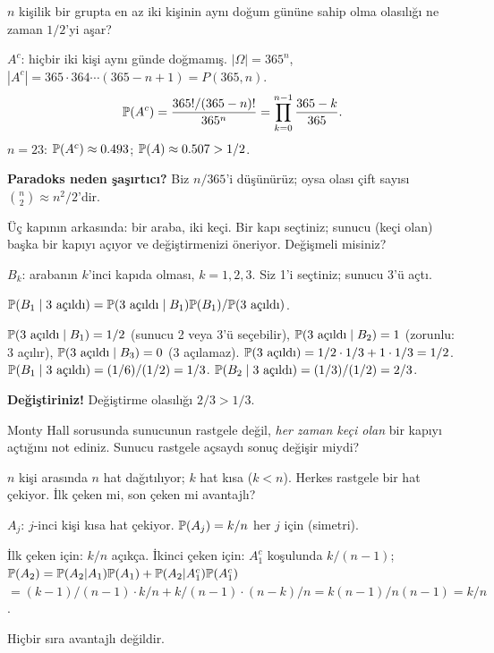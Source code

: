 \begin{ornek}\label{ex:dogumgunu}
$n$ kişilik bir grupta en az iki kişinin aynı doğum gününe sahip olma
olasılığı ne zaman $1/2$'yi aşar?

$A^c$: hiçbir iki kişi aynı günde doğmamış. $|\Omega| = 365^n$,
$|A^c| = 365 \cdot 364 \cdots (365-n+1) = P(365,n)$.
\[
  \mathbb{P}(A^c) = \frac{365!/(365-n)!}{365^n} = \prod_{k=0}^{n-1}\frac{365-k}{365}.
\]
$n=23$: $\mathbb{P}(A^c) \approx 0.493$; $\mathbb{P}(A) \approx 0.507 > 1/2$.

\textbf{Paradoks neden şaşırtıcı?} Biz $n/365$'i düşünürüz; oysa olası çift
sayısı $\binom{n}{2} \approx n^2/2$'dir.
\end{ornek}

\begin{ornek}\label{ex:montyhall}
Üç kapının arkasında: bir araba, iki keçi. Bir kapı seçtiniz; sunucu (keçi
olan) başka bir kapıyı açıyor ve değiştirmenizi öneriyor. Değişmeli misiniz?

$B_k$: arabanın $k$'inci kapıda olması, $k=1,2,3$.
Siz 1'i seçtiniz; sunucu 3'ü açtı.

$\mathbb{P}(B_1 \mid \text{3 açıldı}) = \mathbb{P}(\text{3 açıldı} \mid B_1)\mathbb{P}(B_1) / \mathbb{P}(\text{3 açıldı})$.

$\mathbb{P}(\text{3 açıldı} \mid B_1) = 1/2$ (sunucu 2 veya 3'ü seçebilir),
$\mathbb{P}(\text{3 açıldı} \mid B_2) = 1$ (zorunlu: 3 açılır),
$\mathbb{P}(\text{3 açıldı} \mid B_3) = 0$ (3 açılamaz).
$\mathbb{P}(\text{3 açıldı}) = 1/2 \cdot 1/3 + 1 \cdot 1/3 = 1/2$.
$\mathbb{P}(B_1 \mid \text{3 açıldı}) = (1/6)/(1/2) = 1/3$.
$\mathbb{P}(B_2 \mid \text{3 açıldı}) = (1/3)/(1/2) = 2/3$.

\textbf{Değiştiriniz!} Değiştirme olasılığı $2/3 > 1/3$.
\end{ornek}

\begin{kendinleifade}
Monty Hall sorusunda sunucunun rastgele değil, \emph{her zaman keçi olan}
bir kapıyı açtığını not ediniz. Sunucu rastgele açsaydı sonuç değişir miydi?
\end{kendinleifade}

\begin{ornek}\label{ex:hatchekme}
$n$ kişi arasında $n$ hat dağıtılıyor; $k$ hat kısa ($k < n$). Herkes
rastgele bir hat çekiyor. İlk çeken mi, son çeken mi avantajlı?

$A_j$: $j$-inci kişi kısa hat çekiyor.
$\mathbb{P}(A_j) = k/n$ her $j$ için (simetri).

İlk çeken için: $k/n$ açıkça.
İkinci çeken için: $A_1^c$ koşulunda $k/(n-1)$;
$\mathbb{P}(A_2) = \mathbb{P}(A_2|A_1)\mathbb{P}(A_1) + \mathbb{P}(A_2|A_1^c)\mathbb{P}(A_1^c)$
$= (k-1)/(n-1) \cdot k/n + k/(n-1) \cdot (n-k)/n = k(n-1)/n(n-1) = k/n$.

Hiçbir sıra avantajlı değildir.
\end{ornek}


